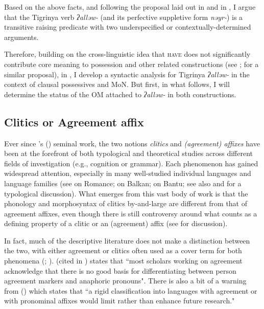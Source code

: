 \documentclass[output=paper]{langscibook}
\begin{document}
Based on the above facts, and following the proposal laid out in \citet{cowper89} and in \citet{ritterandrosen1997}, I argue that the Tigrinya verb \emph{ʔalləw-} (and its perfective suppletive form \emph{nəyr-}) is a transitive raising predicate with two underspecified or contextually-determined arguments. 

Therefore, building on the cross-linguistic idea that {\scshape have} does not significantly contribute core meaning to possession and other related constructions (see \citealt{myler16}; \citealt{kim11} for a similar proposal), in , I develop a syntactic analysis for Tigrinya \emph{ʔalləw-} in the context of clausal possessives and MoN. But first, in what follows, I will determine the status of the OM attached to \emph{ʔalləw-} in both constructions.

 
\subsection{Clitics or Agreement affix}\label{sec:cliticsVsaffixes}\largerpage[2]
Ever since \citeauthor{zwickyandpullum}'s (\citeyear{zwickyandpullum}) seminal work, the two notions \textit{clitics} and \textit{(agreement) affixes} have been at the forefront of both typological and theoretical studies across different fields of investigation (e.g., cognition or grammar). Each phenomenon has gained widespread attention, especially in many well-studied individual languages and language families (see \citealt{uri95} on Romance; \citealt{franco00} on Balkan; \citealt{riedel09} on Bantu; see also \citealt{corbett2006} and \citealt{spencerandluis} for a typological discussion). What emerges from this vast body of work is that the phonology and morphosyntax of clitics by-and-large are different from that of agreement affixes, even though there is still controversy around what counts as a defining property of a clitic or an (agreement) affix (see \citealt{kramer14} for discussion). 

In fact, much of the descriptive literature does not make a distinction between the two, with either agreement or clitics often used as a cover term for both phenomena (\citealt{siewierska99}; \citealt{corbett2006}). \citet[225]{siewierska99} (cited in \citealt[3--4]{croft13}) states that ``most scholars working on agreement acknowledge that there is no good basis for differentiating between person agreement markers and anaphoric pronouns". There is also a bit of a warning from \citeauthor{corbett2006} (\citeyear[112]{corbett2006}) which states that ``a rigid classification into languages with agreement or with pronominal affixes would limit rather than enhance future research." 
\end{document}
